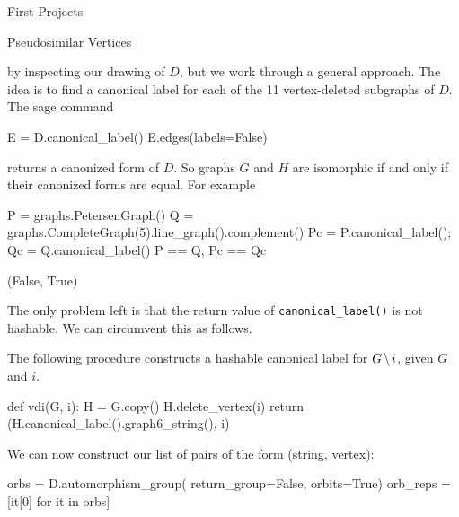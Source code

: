 \begin{chap}{First Projects}
\begin{sect}{Pseudosimilar Vertices}
\begin{para}
by inspecting our drawing of $D$, but we work through a general approach.
The idea is to find a canonical label for each of the 11 vertex-deleted subgraphs
of $D$. The sage command
\end{para}
%
\begin{sagecode}
\begin{sageinput}
E = D.canonical_label()
E.edges(labels=False)
\end{sageinput}
\begin{sageoutput}
[(0, 10), (1, 10), (2, 8), (3, 9), (4, 6), 
(4, 10), (5, 7), (5, 8), (6, 9), (7, 9)]
\end{sageoutput}
\end{sagecode}
%
\begin{para}
returns a canonized form of $D$. So graphs $G$ and $H$ are isomorphic if and only if
their canonized forms are equal. For example
\end{para}
%
\begin{sagecode}
\begin{sageinput}
P = graphs.PetersenGraph()
Q = graphs.CompleteGraph(5).line_graph().complement()
Pc = P.canonical_label(); Qc = Q.canonical_label()
P == Q, Pc == Qc
\end{sageinput}
\begin{sageoutput}
(False, True)
\end{sageoutput}
\end{sagecode}
%
\begin{para}
The only problem left is that the return value of \verb|canonical_label()|
is not hashable. We can circumvent this as follows.
\end{para}
%
\begin{para}
The following procedure constructs a hashable canonical label for 
$G\mathbin{\mkern-1.5mu\setminus\mkern-1.5mu} i$, given $G$ and $i$.
\end{para}
%
\begin{sagecode}
\begin{sageinput}
def vdi(G, i):
    H = G.copy()
    H.delete_vertex(i)
    return (H.canonical_label().graph6_string(), i)
\end{sageinput}
\end{sagecode}
%
\begin{para}
We can now construct our list of pairs of the form (string, vertex):
\end{para}
%
\begin{sagecode}
\begin{sageinput}
orbs = D.automorphism_group( return_group=False, orbits=True)
orb_reps = [it[0] for it in orbs]

\end{sageinput}
\end{sagecode}
\end{sect}
\end{chap}
